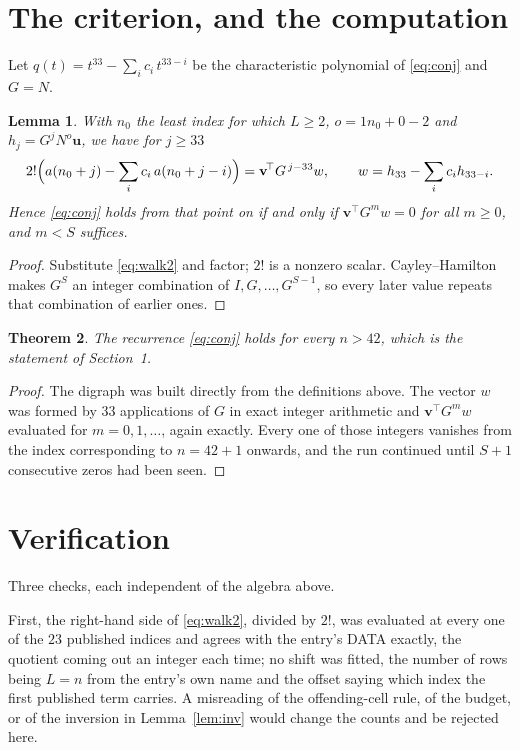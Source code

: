 \documentclass[11pt,a4paper]{article}
\theoremstyle{plain}
\newtheorem{theorem}{Theorem}
\newtheorem{lemma}[theorem]{Lemma}
\theoremstyle{definition}
\begin{document}
\section{The criterion, and the computation}

Let $q(t)=t^{33}-\sum_i c_i\,t^{33-i}$ be the characteristic polynomial of
\eqref{eq:conj} and $G=N$.

\begin{lemma}\label{lem:crit}
With $n_0$ the least index for which $L\ge2$, $o=1n_0+0-2$ and
$h_j=G^{j}N^{o}\mathbf{u}$, we have for $j\ge33$
\[
2!\Bigl(a(n_0+j)-\sum_i c_i\,a(n_0+j-i)\Bigr)=\mathbf{v}^{\!\top}G^{\,j-33}w,
\qquad w=h_{33}-\sum_i c_i h_{33-i} .
\]
Hence \eqref{eq:conj} holds from that point on if and only if
$\mathbf{v}^{\!\top}G^{m}w=0$ for all $m\ge0$, and $m<S$ suffices.
\end{lemma}

\begin{proof}
Substitute \eqref{eq:walk2} and factor; $2!$ is a nonzero scalar. Cayley--Hamilton
makes $G^{S}$ an integer combination of $I,G,\dots,G^{S-1}$, so every later value repeats
that combination of earlier ones.
\end{proof}

\begin{theorem}
The recurrence \eqref{eq:conj} holds for every $n>42$, which is the statement of
Section~1.
\end{theorem}

\begin{proof}
The digraph was built directly from the definitions above. The vector $w$ was formed by
$33$ applications of $G$ in exact integer arithmetic and $\mathbf{v}^{\!\top}G^{m}w$
evaluated for $m=0,1,\dots$, again exactly. Every one of those integers vanishes from the
index corresponding to $n=42+1$ onwards, and the run continued until $S+1$ consecutive
zeros had been seen.
\end{proof}

\section{Verification}

Three checks, each independent of the algebra above.

First, the right-hand side of \eqref{eq:walk2}, divided by $2!$, was evaluated at every
one of the $23$ published indices and agrees with the entry's DATA exactly, the quotient
coming out an integer each time; no shift was fitted, the number of rows being
$L=n$ from the entry's own name and the offset saying which index the first published
term carries. A misreading of the offending-cell rule, of the budget, or of the inversion in
Lemma~\ref{lem:inv} would change the counts and be rejected here.
\end{document}
